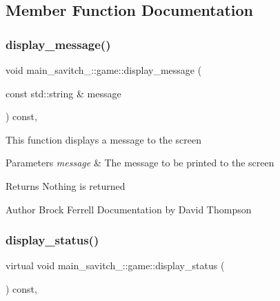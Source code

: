 \subsection{Member Function Documentation}
\mbox{\label{classmain__savitch__14_1_1game_ac58bfc07db8e604b07d2039b2cf7ab51}} 
\subsubsection{\texorpdfstring{display\+\_\+message()}{display\_message()}}
{\footnotesize\ttfamily void main\+\_\+savitch\+\_\+::game\+::display\+\_\+message (\begin{DoxyParamCaption}\item[{const std\+::string \&}]{message }\end{DoxyParamCaption}) const\hspace{0.3cm}{\ttfamily [protected]}, {\ttfamily [virtual]}}

This function displays a message to the screen 
\begin{DoxyParams}{Parameters}
{\em message} & The message to be printed to the screen \\
\hline
\end{DoxyParams}
\begin{DoxyReturn}{Returns}
Nothing is returned 
\end{DoxyReturn}
\begin{DoxyAuthor}{Author}
Brock Ferrell Documentation by David Thompson 
\end{DoxyAuthor}
\mbox{\label{classmain__savitch__14_1_1game_ac8205178922c49bab2865187e834b726}} 
\subsubsection{\texorpdfstring{display\+\_\+status()}{display\_status()}}
{\footnotesize\ttfamily virtual void main\+\_\+savitch\+\_\+::game\+::display\+\_\+status (\begin{DoxyParamCaption}{ }\end{DoxyParamCaption}) const\hspace{0.3cm}{\ttfamily [protected]}, {}}



